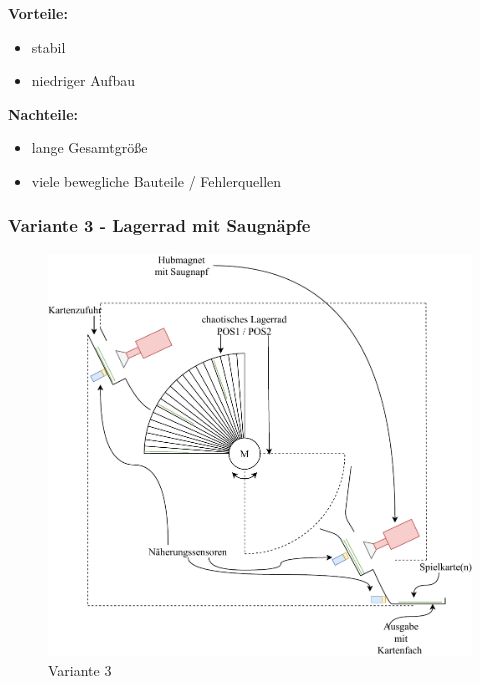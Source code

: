 \textbf{Vorteile:}
\begin{itemize}
    \item stabil
    \item niedriger Aufbau
\end{itemize}
\textbf{Nachteile:}
\begin{itemize}
    \item lange Gesamtgröße
    \item viele bewegliche Bauteile / Fehlerquellen
\end{itemize}

\subsubsection{Variante 3 - Lagerrad mit Saugnäpfe}

\begin{figure}[H]
    \centering
    \includegraphics[scale=0.9,page=1]{fig/mech/Version3}
    \caption{Variante 3}
\end{figure}

